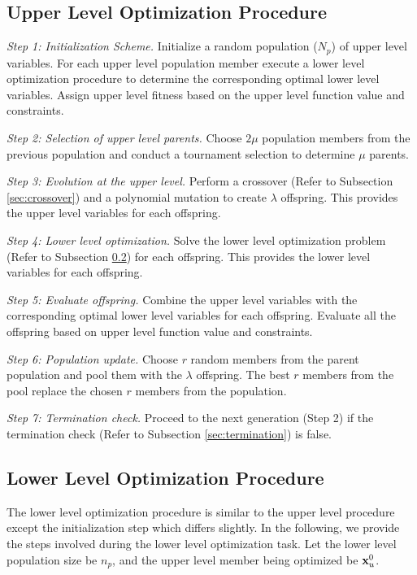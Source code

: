 \documentclass[twoside]{article}
\begin{document}
\subsection{Upper Level Optimization Procedure}\label{sec:upperLevel}
\textit{}
\vspace{-7mm}

\textit{Step 1: Initialization Scheme.} Initialize a random population ($N_p$) of upper level variables. For each upper level population member execute a lower level optimization procedure to determine the corresponding optimal lower level variables. Assign upper level fitness based on the upper level function value and constraints.

\textit{Step 2: Selection of upper level parents.} Choose $2\mu$ population members from the previous population and conduct a tournament selection to determine $\mu$ parents.

\textit{Step 3: Evolution at the upper level.} Perform a crossover (Refer to Subsection \ref{sec:crossover}) and a polynomial mutation to create $\lambda$ offspring. This provides the upper level variables for each offspring.

\textit{Step 4: Lower level optimization.} Solve the lower level optimization problem (Refer to Subsection \ref{sec:lowerLevel}) for each offspring. This provides the lower level variables for each offspring.

\textit{Step 5: Evaluate offspring.} Combine the upper level variables with the corresponding optimal lower level variables for each offspring. Evaluate all the offspring based on upper level function value and constraints.

\textit{Step 6: Population update.} Choose $r$ random members from the parent population and pool them with the $\lambda$ offspring. The best $r$ members from the pool replace the chosen $r$ members from the population.

\textit{Step 7: Termination check.} Proceed to the next generation (Step 2) if the termination check (Refer to Subsection \ref{sec:termination}) is false.

\subsection{Lower Level Optimization Procedure}\label{sec:lowerLevel}
The lower level optimization procedure is similar to the upper level procedure except the initialization step which differs slightly. In the following, we provide the steps involved during the lower level optimization task. Let the lower level population size be $n_p$, and the upper level member being optimized be $\mbox{$\mathbf{x}$}_{u}^{0}$.
\end{document}
